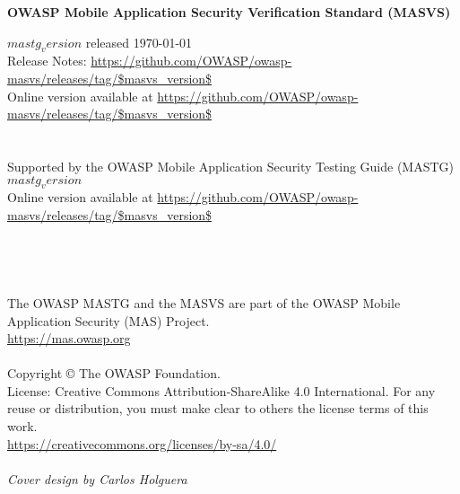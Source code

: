 \thispagestyle{empty} %

\textbf{OWASP Mobile Application Security Verification Standard (MASVS)}

$mastg_version$ released \today \\

Release Notes: \url{https://github.com/OWASP/owasp-masvs/releases/tag/$masvs_version$} \\

Online version available at \url{https://github.com/OWASP/owasp-masvs/releases/tag/$masvs_version$} \\ \\ \\


Supported by the OWASP Mobile Application Security Testing Guide (MASTG) $mastg_version$ \\

Online version available at \url{https://github.com/OWASP/owasp-masvs/releases/tag/$masvs_version$} \\ \\ \\ \\ \\



The OWASP MASTG and the MASVS are part of the OWASP Mobile Application Security (MAS) Project. \\
\url{https://mas.owasp.org} \\ \\

Copyright © The OWASP Foundation. \\

License: Creative Commons Attribution-ShareAlike 4.0 International.
For any reuse or distribution, you must make clear to others the license terms of this work. \\
\url{https://creativecommons.org/licenses/by-sa/4.0/} \\ \\


\emph{Cover design by Carlos Holguera}
